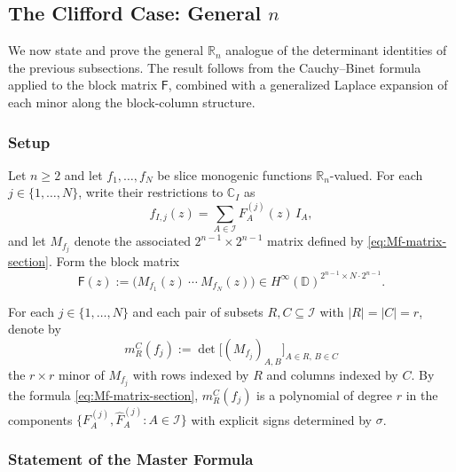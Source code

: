 \documentclass[11pt]{amsart}
\begin{document}
\subsection{\texorpdfstring{The Clifford Case: General $n$}{The Clifford Case: General n}}

We now state and prove the general $\mathbb{R}_n$ analogue of the determinant identities of the previous subsections. The result follows from the Cauchy--Binet formula applied to the block matrix $\mathsf{F}$, combined with a generalized Laplace expansion of each minor along the block-column structure.

\subsubsection{Setup}

Let $n \ge 2$ and let $f_{1}, \ldots, f_{N}$ be slice monogenic functions $\mathbb{R}_n$-valued. For each $j \in \{1,\ldots,N\}$, write their restrictions to $\mathbb{C}_I$ as
\[
f_{I,j}(z) = \sum_{A \in \mathcal I} F_A^{(j)}(z)\, I_A,
\]
and let $M_{f_j}$ denote the associated $2^{n-1} \times 2^{n-1}$ matrix defined by \eqref{eq:Mf-matrix-section}. Form the block matrix
\begin{equation}\label{eq:blockF-general}
\mathsf{F}(z) := \bigl(M_{f_1}(z)\ \cdots\ M_{f_N}(z)\bigr) \in H^\infty(\mathbb{D})^{2^{n-1}\times N \cdot 2^{n-1}}.
\end{equation}

For each $j \in \{1,\ldots,N\}$ and each pair of subsets $R, C \subseteq \mathcal I$ with $|R| = |C| = r$, denote by
\begin{equation}\label{eq:Mf-minor-RC}
m_R^C(f_j) := \det\bigl[(M_{f_j})_{A,B}\bigr]_{A \in R,\, B \in C}
\end{equation}
the $r\times r$ minor of $M_{f_j}$ with rows indexed by $R$ and columns indexed by $C$. By the formula \eqref{eq:Mf-matrix-section}, $m_R^C(f_j)$ is a polynomial of degree $r$ in the components $\{F_A^{(j)}, \hat F_A^{(j)} : A \in \mathcal I\}$ with explicit signs determined by $\sigma$.

\subsubsection{Statement of the Master Formula}
\end{document}
